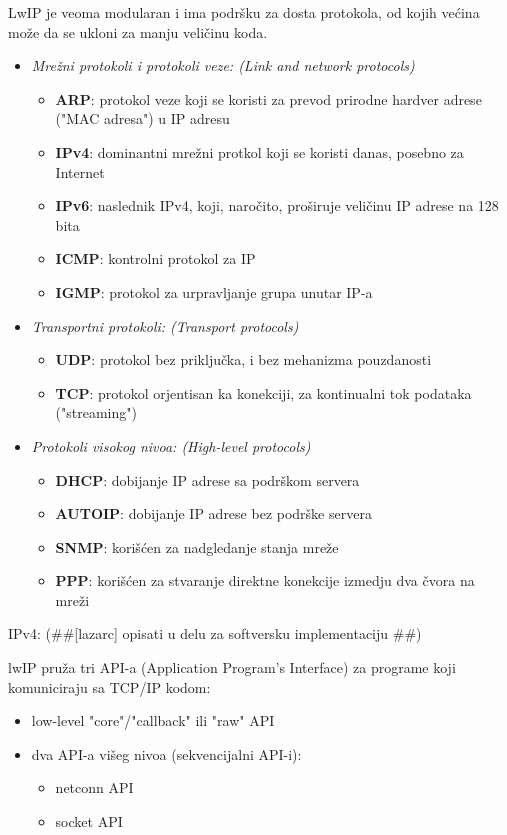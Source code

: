 \documentclass[a4paper,12pt, master]{etf}
\begin{document}
	LwIP je veoma modularan i ima podr\v{s}ku za dosta protokola, od kojih ve\'{c}ina mo\v{z}e da se
	ukloni za manju veli\v{c}inu koda.
	\begin{itemize}
		\item \textit{Mre\v{z}ni protokoli i protokoli veze: (Link and network protocols)}
		\begin{itemize}
			\item \textbf{ARP}: protokol veze koji se koristi za prevod prirodne hardver adrese
			("MAC adresa") u IP adresu
			\item \textbf{IPv4}: dominantni mre\v{z}ni protkol koji se koristi danas, posebno za
			Internet
			\item \textbf{IPv6}: naslednik IPv4, koji, naro\v{c}ito, pro\v{s}iruje veli\v{c}inu IP adrese
			na 128 bita
			\item \textbf{ICMP}: kontrolni protokol za IP
			\item \textbf{IGMP}: protokol za urpravljanje grupa unutar IP-a
		\end{itemize}
		\item \textit{Transportni protokoli: (Transport protocols)}
			\begin{itemize}
				\item \textbf{UDP}: protokol bez priklju\v{c}ka, i bez mehanizma pouzdanosti
				\item \textbf{TCP}: protokol orjentisan ka konekciji, za kontinualni tok
				podataka ("streaming")
			\end{itemize}
		\item \textit{Protokoli visokog nivoa: (High-level protocols)}
			\begin{itemize}
				\item \textbf{DHCP}: dobijanje IP adrese sa podr\v{s}kom servera
				\item \textbf{AUTOIP}: dobijanje IP adrese bez podr\v{s}ke servera
				\item \textbf{SNMP}: kori\v{s}\'{c}en za nadgledanje stanja mre\v{z}e
				\item \textbf{PPP}: kori\v{s}\'{c}en za stvaranje direktne konekcije izmedju dva \v{c}vora
				na mre\v{z}i
			\end{itemize}
	\end{itemize}

	IPv4: (\#\#[lazarc] opisati u delu za softversku implementaciju \#\#)

	lwIP pru\v{z}a tri API-a (Application Program's Interface) za programe koji komuniciraju sa
	TCP/IP kodom:
	\begin{itemize}
		\item low-level "core"/"callback" ili "raw" API
		\item dva API-a vi\v{s}eg nivoa (sekvencijalni API-i):
			\begin{itemize}
				\item netconn API
				\item socket API
			\end{itemize}
	\end{itemize}
\end{document}
